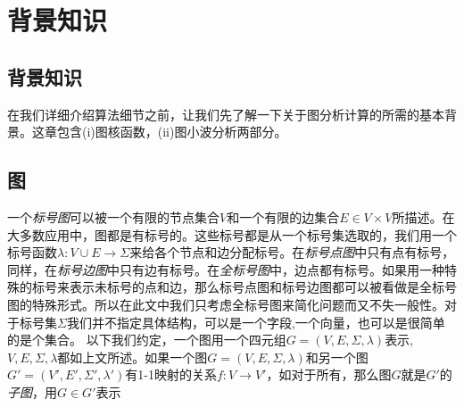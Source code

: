 \documentclass{article}
\begin{document}
\section{背景知识}
\else
\subsection{背景知识}
\fi
在我们详细介绍算法细节之前，让我们先了解一下关于图分析计算的所需的基本背景。这章包含(i)图核函数，(ii)图小波分析两部分。
\subsection{图}
一个\emph{标号图}可以被一个有限的节点集合$V$和一个有限的边集合$E\in V\times V$所描述。在大多数应用中，图都是有标号的。这些标号都是从一个标号集选取的，我们用一个标号函数$\lambda :V\cup E\rightarrow \Sigma$来给各个节点和边分配标号。在\emph{标号点图}中只有点有标号，同样，在\emph{标号边图}中只有边有标号。在\emph{全标号图}中，边点都有标号。如果用一种特殊的标号来表示未标号的点和边，那么标号点图和标号边图都可以被看做是全标号图的特殊形式。所以在此文中我们只考虑全标号图来简化问题而又不失一般性。对于标号集$\Sigma$我们并不指定具体结构，可以是一个字段,一个向量，也可以是很简单的是个集合。
以下我们约定，一个图用一个四元组$G=(V,E,\Sigma ,\lambda )$表示,$V,E,\Sigma,\lambda$都如上文所述。如果一个图$G=(V,E,\Sigma,\lambda)$和另一个图$G'=(V',E',\Sigma',\lambda')$有1-1映射的关系$f:V\rightarrow V'$，如对于所有，那么图$G$就是$G'$的\emph{子图}，用$G\in G' $表示



\ifx\allfiles\undefined
%
%
\end{document}
